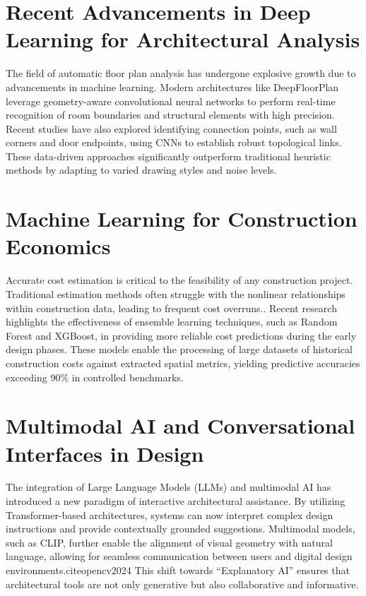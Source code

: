 \documentclass[12pt]{report}
\begin{document}
\section{Recent Advancements in Deep Learning for Architectural Analysis}

The field of automatic floor plan analysis has undergone explosive growth due to advancements in machine learning\cite{threejs2024}. Modern architectures like DeepFloorPlan\cite{liu2017} leverage geometry-aware convolutional neural networks to perform real-time recognition of room boundaries and structural elements with high precision. Recent studies have also explored identifying connection points, such as wall corners and door endpoints, using CNNs to establish robust topological links\cite{liu2017}. These data-driven approaches significantly outperform traditional heuristic methods by adapting to varied drawing styles and noise levels.

\section{Machine Learning for Construction Economics}

Accurate cost estimation is critical to the feasibility of any construction project. Traditional estimation methods often struggle with the nonlinear relationships within construction data, leading to frequent cost overruns\cite{liu2017, threejs2024}.. Recent research highlights the effectiveness of ensemble learning techniques, such as Random Forest and XGBoost, in providing more reliable cost predictions during the early design phases. These models enable the processing of large datasets of historical construction costs against extracted spatial metrics, yielding predictive accuracies exceeding 90\% in controlled benchmarks.

\section{Multimodal AI and Conversational Interfaces in Design}

The integration of Large Language Models (LLMs) and multimodal AI has introduced a new paradigm of interactive architectural assistance. By utilizing Transformer-based architectures, systems can now interpret complex design instructions and provide contextually grounded suggestions. Multimodal models, such as CLIP, further enable the alignment of visual geometry with natural language, allowing for seamless communication between users and digital design environments.cite{opencv2024} This shift towards ``Explanatory AI'' ensures that architectural tools are not only generative but also collaborative and informative.
\end{document}
